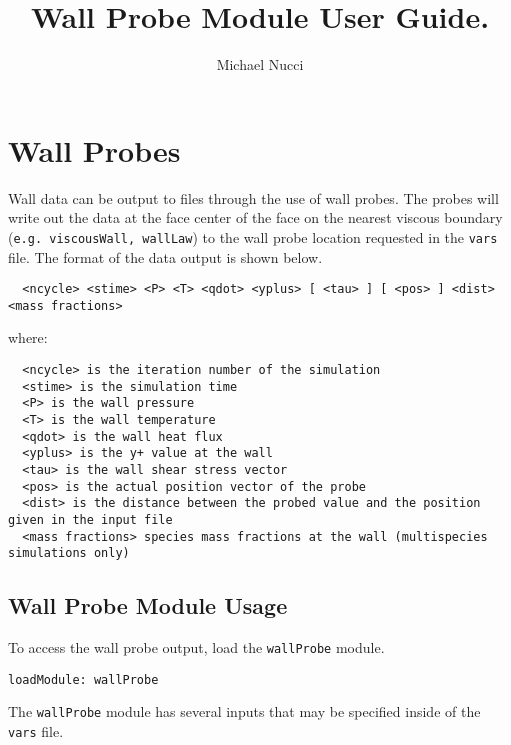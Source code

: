 \documentclass{article}
\begin{document}
\title{Wall Probe Module User Guide.}

\author{ Michael Nucci }

\maketitle
\section{Wall Probes}

Wall data can be output to files through the use of wall probes. The probes will write out the data at the face center of the face on the nearest viscous boundary ({\tt e.g. viscousWall, wallLaw}) to the wall probe location requested in the {\tt vars} file. The format of the data output is shown below.

\begin{verbatim}
  <ncycle> <stime> <P> <T> <qdot> <yplus> [ <tau> ] [ <pos> ] <dist> <mass fractions>
\end{verbatim}
where:
\begin{verbatim}
  <ncycle> is the iteration number of the simulation 
  <stime> is the simulation time 
  <P> is the wall pressure
  <T> is the wall temperature
  <qdot> is the wall heat flux
  <yplus> is the y+ value at the wall
  <tau> is the wall shear stress vector
  <pos> is the actual position vector of the probe
  <dist> is the distance between the probed value and the position given in the input file
  <mass fractions> species mass fractions at the wall (multispecies simulations only)
\end{verbatim}

\subsection{Wall Probe Module Usage}

To access the wall probe output, load the {\tt wallProbe} module.

\begin{verbatim}
loadModule: wallProbe
\end{verbatim}

The {\tt wallProbe} module has several inputs that may be specified inside of the {\tt vars} file.
\end{document}
